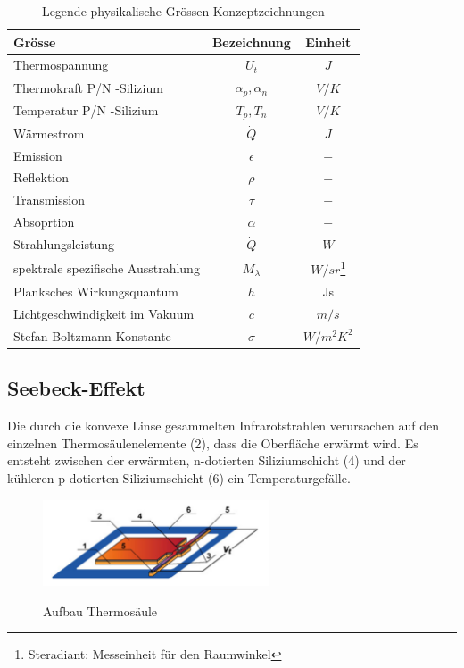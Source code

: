 \begin{table}[H]
	\centering
	\begin{tabular}{l|c|c}
		\rowcolor{gray} Grösse &  Bezeichnung  & Einheit \\
		\hline 
		Thermospannung &  $ U_{t}$ & $J$  \\ 
		\rowcolor{gray} Thermokraft P/N -Silizium  & $\alpha_{p},\alpha_{n}$ & $V/K$\\	
		Temperatur P/N -Silizium &  $T_{p},T_{n}$ & $V/K$ \\
		\rowcolor{gray}Wärmestrom &  $\dot{Q}$ & $J$  \\ 
		Emission & $\epsilon$ & $-$\\	
		\rowcolor{gray}Reflektion &  $\rho $ & $-$ \\
		Transmission & $\tau$ & $-$\\
		\rowcolor{gray}Absoprtion &  $\alpha$ & $-$  \\ 
		Strahlungsleistung & $\dot{Q}$ & $W$\\
		\rowcolor{gray}spektrale spezifische Ausstrahlung &  $M_{\lambda }$ & $W/sr$\footnote[3]{Steradiant: Messeinheit für den Raumwinkel} \\
		Planksches Wirkungsquantum &  $ h$ & Js \\ 
		\rowcolor{gray} Lichtgeschwindigkeit im Vakuum & $c $ & $ m/s$ \\ 
 		Stefan-Boltzmann-Konstante & $\sigma$ & $ W/m^2K^2 $ \\ 
	\end{tabular}
	\caption{Legende physikalische Grössen Konzeptzeichnungen}
	\label{tab:Legende Physikalische Grössen} 
\end{table} 


\subsection{Seebeck-Effekt}
\label{subsec:seebeck}
Die durch die konvexe Linse gesammelten Infrarotstrahlen verursachen auf den einzelnen Thermosäulenelemente (2), dass die Oberfläche erwärmt wird. Es entsteht zwischen der erwärmten, n-dotierten Siliziumschicht (4) und der kühleren p-dotierten Siliziumschicht (6) ein Temperaturgefälle.   

\begin{figure}[H]
	\centering
	\includegraphics[width=0.6\textwidth]
	{fig/Mems_Thermopile.PNG}
	\caption[Aufbau Thermosäulenelement]{Aufbau Thermosäule} \protect\cite{AMG8834}
	\label{fig:AufbauThermo}
\end{figure}

